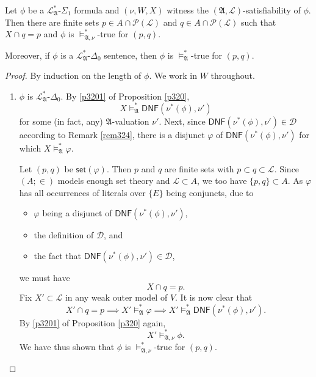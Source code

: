 \documentclass[12pt]{article}
\numberwithin{equation}{section}
\begin{document}
\begin{lem}\label{exist}
Let $\phi$ be a $\mathcal{L}^{*}_{\mathfrak{A}}$-$\Sigma_1$ formula and $(\nu, W, X)$ witness the $(\mathfrak{A}, \mathcal{L})$-satisfiability of $\phi$. Then there are finite sets $p \in A \cap \mathcal{P}(\mathcal{L})$ and $q \in A \cap \mathcal{P}(\mathcal{L})$ such that $X \cap q = p$ and $\phi$ is $\models^*_{\mathfrak{A}, \nu}$-true for $(p, q)$.

Moreover, if $\phi$ is a $\mathcal{L}^{*}_{\mathfrak{A}}$-$\Delta_0$ sentence, then $\phi$ is $\models^*_{\mathfrak{A}}$-true for $(p, q)$.
\end{lem}

\begin{proof}
By induction on the length of $\phi$. We work in $W$ throughout.
\begin{enumerate}[label=Case \arabic*:, leftmargin=50pt]
    \item $\phi$ is $\mathcal{L}^{*}_{\mathfrak{A}}$-$\Delta_0$. By \ref{p3201} of Proposition \ref{p320}, $$X \models^*_{\mathfrak{A}} \mathsf{DNF}(\nu^*(\phi), \nu')$$ for some (in fact, any) $\mathfrak{A}$-valuation $\nu'$. Next, since $\mathsf{DNF}(\nu^*(\phi), \nu') \in \mathcal{D}$ according to Remark \ref{rem324}, there is a disjunct $\varphi$ of $\mathsf{DNF}(\nu^*(\phi), \nu')$ for which $X \models^*_{\mathfrak{A}} \varphi$. 
    
    Let $(p, q)$ be $\mathsf{set}(\varphi)$. Then $p$ and $q$ are finite sets with $p \subset q \subset \mathcal{L}$. Since $(A; \in)$ models enough set theory and $\mathcal{L} \subset A$, we too have $\{p, q\} \subset A$. As $\varphi$ has all occurrences of literals over $\{E\}$ being conjuncts, due to 
    \begin{itemize}
        \item $\varphi$ being a disjunct of $\mathsf{DNF}(\nu^*(\phi), \nu')$,
        \item the definition of $\mathcal{D}$, and 
        \item the fact that $\mathsf{DNF}(\nu^*(\phi), \nu') \in \mathcal{D}$, 
    \end{itemize} 
    we must have $$X \cap q = p.$$ Fix $X' \subset \mathcal{L}$ in any weak outer model of $V$. It is now clear that $$X' \cap q = p \implies X' \models^*_{\mathfrak{A}} \varphi \implies X' \models^*_{\mathfrak{A}} \mathsf{DNF}(\nu^*(\phi), \nu').$$ By \ref{p3201} of Proposition \ref{p320} again, $$X' \models^*_{\mathfrak{A}, \nu} \phi \text{.}$$ We have thus shown that $\phi$ is $\models^*_{\mathfrak{A}, \nu}$-true for $(p, q)$.


\end{enumerate}
\end{proof}
\end{document}
